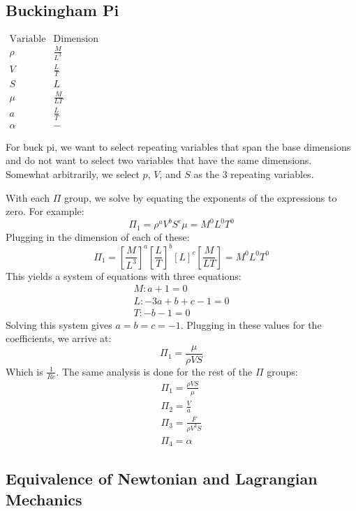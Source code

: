 \documentclass[12pt]{report}
\begin{document}
{\subsection{Buckingham Pi}\label{Buckingham Pi Deriv}

\begin{center}
$\begin{array}{ccc}
     \text{Variable} & \text{Dimension}
     &  \\ \rho & \frac{M}{L^3}
     &  \\ V    & \frac{L}{T}
     &  \\ S    & L
     &  \\\mu &  \frac{M}{LT}
     &  \\a & \frac{L}{T}
     & \\\alpha & -
\end{array}$
\end{center}

For \gls{buck pi}, we want to select repeating variables that span the base dimensions and do not want to select two variables that have the same dimensions. Somewhat arbitrarily, we select $p$, $V$, and $S$ as the 3 repeating variables.

With each $\Pi$ group, we solve by equating the exponents of the expressions to zero. For example:
$$\Pi_1=\rho^aV^bS^c\mu=M^0L^0T^0$$
Plugging in the dimension of each of these:
$$\Pi_1=\left[\frac{M}{L^3}\right]^a\left[\frac{L}{T}\right]^b[L]^c\left[\frac{M}{LT}\right]=M^0L^0T^0$$
This yields a system of equations with three equations:
\begin{gather}
    M:a+1=0\\L:-3a+b+c-1=0\\T:-b-1=0
\end{gather}
Solving this system gives $a=b=c=-1$. Plugging in these values for the coefficients, we arrive at:
$$\Pi_1=\frac{\mu}{\rho VS}$$
Which is $\frac{1}{Re}$.  The same analysis is done for the rest of the $\Pi$ groups:
\begin{gather}
    \Pi_1=\frac{\rho VS}{\mu}\\
    \Pi_2=\frac{V}{a}\\
    \Pi_3=\frac{F}{\rho V^2S}\\
    \Pi_4=\alpha
\end{gather}
\subsection{Equivalence of Newtonian and Lagrangian Mechanics}\label{equiv newt and lang}

}
\end{document}
